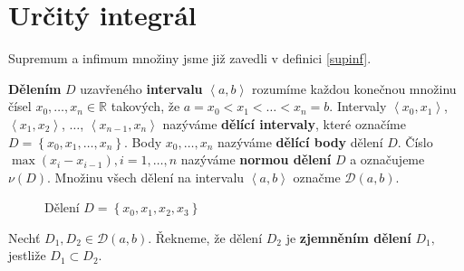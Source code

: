 \section{Určitý integrál}
\begin{pozn}
    Supremum a infimum množiny jsme již zavedli v definici \ref{supinf}.
\end{pozn}

\begin{definition}
\textbf{Dělením} $D$ uzavřeného \textbf{intervalu} $\left<  a,b \right> $
rozumíme každou konečnou množinu čísel $x_0,\dots,x_n \in \mathbb R$ takových, že
$a=x_0<x_1<\dots<x_n=b.$ Intervaly $\left<  x_0, x_1 \right>$,
$\left<  x_1, x_2 \right>$, $\dots$, $\left<  x_{n-1}, x_n \right>$ nazýváme
\textbf{dělící intervaly}, které označíme $D=\left \{ x_0,x_1,\dots,x_n \right \} .$
Body $x_0,\dots,x_n$ nazýváme \textbf{dělící body} dělení $D$. Číslo
$\max \left ( x_i-x_{i-1} \right ), i=1,\dots,n $ nazýváme \textbf{normou dělení}
$D$ a označujeme $\nu(D).$ Množinu všech dělení na intervalu $\left<  a,b \right> $
označme $\mathscr D(a,b).$
\end{definition}

\begin{figure}[ht!]
  \centering
  \caption{Dělení $D=\left \{ x_0, x_1, x_2, x_3 \right\}$}
\end{figure}

\begin{definition}
Nechť $D_1, D_2 \in \mathscr D(a,b)$. Řekneme, že dělení $D_2$ je \textbf{zjemněním dělení} $D_1,$ jestliže $D_1 \subset D_2.$
\end{definition}

